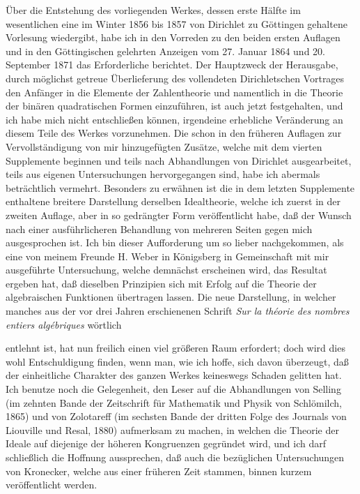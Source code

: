\documentclass[11pt]{article}
\newcommand{\origpage}[1]{\par\vspace{0.25em}\noindent{\footnotesize\itshape [Gedruckte Seite #1]}\par\vspace{0.25em}}
\begin{document}
Über die Entstehung des vorliegenden Werkes, dessen erste Hälfte im wesentlichen eine im Winter 1856 bis 1857 von Dirichlet zu Göttingen gehaltene Vorlesung wiedergibt, habe ich in den Vorreden zu den beiden ersten Auflagen und in den Göttingischen gelehrten Anzeigen vom 27. Januar 1864 und 20. September 1871 das Erforderliche berichtet. Der Hauptzweck der Herausgabe, durch möglichst getreue Überlieferung des vollendeten Dirichletschen Vortrages den Anfänger in die Elemente der Zahlentheorie und namentlich in die Theorie der binären quadratischen Formen einzuführen, ist auch jetzt festgehalten, und ich habe mich nicht entschließen können, irgendeine erhebliche Veränderung an diesem Teile des Werkes vorzunehmen. Die schon in den früheren Auflagen zur Vervollständigung von mir hinzugefügten Zusätze, welche mit dem vierten Supplemente beginnen und teils nach Abhandlungen von Dirichlet ausgearbeitet, teils aus eigenen Untersuchungen hervorgegangen sind, habe ich abermals beträchtlich vermehrt. Besonders zu erwähnen ist die in dem letzten Supplemente enthaltene breitere Darstellung derselben Idealtheorie, welche ich zuerst in der zweiten Auflage, aber in so gedrängter Form veröffentlicht habe, daß der Wunsch nach einer ausführlicheren Behandlung von mehreren Seiten gegen mich ausgesprochen ist. Ich bin dieser Aufforderung um so lieber nachgekommen, als eine von meinem Freunde H. Weber in Königsberg in Gemeinschaft mit mir ausgeführte Untersuchung, welche demnächst erscheinen wird, das Resultat ergeben hat, daß dieselben Prinzipien sich mit Erfolg auf die Theorie der algebraischen Funktionen übertragen lassen. Die neue Darstellung, in welcher manches aus der vor drei Jahren erschienenen Schrift \textit{Sur la théorie des nombres entiers algébriques} wörtlich

\origpage{425}
entlehnt ist, hat nun freilich einen viel größeren Raum erfordert; doch wird dies wohl Entschuldigung finden, wenn man, wie ich hoffe, sich davon überzeugt, daß der einheitliche Charakter des ganzen Werkes keineswegs Schaden gelitten hat. Ich benutze noch die Gelegenheit, den Leser auf die Abhandlungen von Selling (im zehnten Bande der Zeitschrift für Mathematik und Physik von Schlömilch, 1865) und von Zolotareff (im sechsten Bande der dritten Folge des Journals von Liouville und Resal, 1880) aufmerksam zu machen, in welchen die Theorie der Ideale auf diejenige der höheren Kongruenzen gegründet wird, und ich darf schließlich die Hoffnung aussprechen, daß auch die bezüglichen Untersuchungen von Kronecker, welche aus einer früheren Zeit stammen, binnen kurzem veröffentlicht werden.
\end{document}
